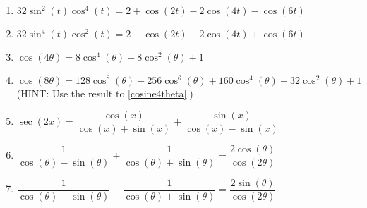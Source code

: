 \begin{enumerate}

\setcounter{enumi}{\value{HW}}

\item  $32\sin^{2}(t) \cos^{4}(t) = 2 + \cos(2t) - 2\cos(4t) - \cos(6t)$
\item  $32\sin^{4}(t) \cos^{2}(t) = 2 - \cos(2t) - 2\cos(4t) + \cos(6t)$
\item \label{cosine4theta} $\cos(4\theta) = 8\cos^{4}(\theta) - 8\cos^{2}(\theta) + 1$
\item  $\cos(8\theta) = 128\cos^{8}(\theta)-256\cos^{6}(\theta)+160\cos^{4}(\theta)-32\cos^{2}(\theta)+1$ (HINT:  Use the result to \ref{cosine4theta}.)
\item  $\sec(2x) = \dfrac{\cos(x)}{\cos(x) + \sin(x)} + \dfrac{\sin(x)}{\cos(x)-\sin(x)}$ 
\item  $\dfrac{1}{\cos(\theta) - \sin(\theta)} + \dfrac{1}{\cos(\theta) + \sin(\theta)} = \dfrac{2\cos(\theta)}{\cos(2\theta)}$
\item  $\dfrac{1}{\cos(\theta) - \sin(\theta)} - \dfrac{1}{\cos(\theta) + \sin(\theta)} = \dfrac{2\sin(\theta)}{\cos(2\theta)}$ \label{moreidentlast}

\setcounter{HW}{\value{enumi}}

\end{enumerate}

